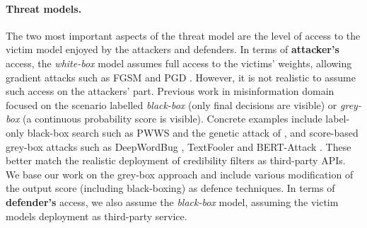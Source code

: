 \documentclass[11pt]{article}
\begin{document}
\paragraph{Threat models.}
The two most important aspects of the threat model are the level of access to the victim model enjoyed by the attackers and defenders. In terms of \textbf{attacker's} access, the \textit{white-box} model assumes full access to the victims' weights, allowing gradient attacks such as FGSM \citep{Goodfellow2015} and PGD \citep{Madry2018}. However, it is not realistic to assume such access on the attackers' part. Previous work in misinformation domain focused on the scenario labelled \textit{black-box} (only final decisions are visible) or \textit{grey-box} (a continuous probability score is visible). Concrete examples include label-only black-box search such as PWWS \citep{Ren2019} and the genetic attack of \citet{Alzantot2018}, and score-based grey-box attacks such as DeepWordBug \citep{Gao2018}, TextFooler \citep{Jin2020} and BERT-Attack \citep{Li2020bert}. These better match the realistic deployment of credibility filters as third-party APIs. We base our work on the grey-box approach and include various modification of the output score (including black-boxing) as defence techniques. In terms of \textbf{defender's} access, we also assume the \textit{black-box} model, assuming the victim models deployment as third-party service.
\end{document}
